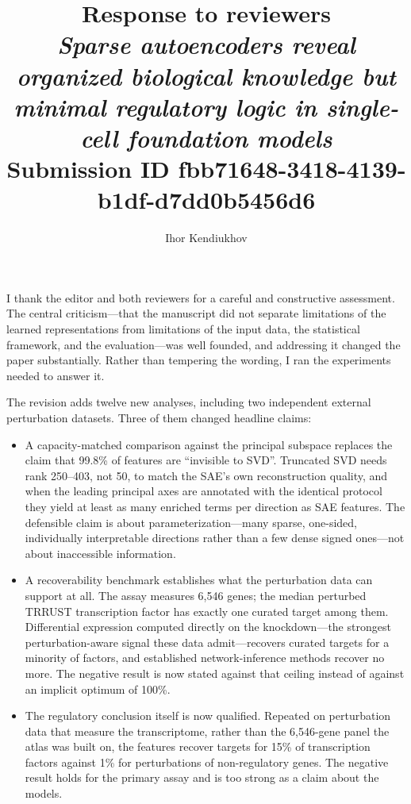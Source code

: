\documentclass[11pt]{article}
\title{Response to reviewers\\[4pt]
\large \emph{Sparse autoencoders reveal organized biological knowledge but minimal regulatory
logic in single-cell foundation models}\\[2pt]
\normalsize Submission ID fbb71648-3418-4139-b1df-d7dd0b5456d6}
\author{Ihor Kendiukhov}
\date{}
\begin{document}
\maketitle

\noindent
I thank the editor and both reviewers for a careful and constructive assessment. The central
criticism---that the manuscript did not separate limitations of the learned representations from
limitations of the input data, the statistical framework, and the evaluation---was well founded,
and addressing it changed the paper substantially. Rather than tempering the wording, I ran the
experiments needed to answer it.

The revision adds twelve new analyses, including two independent external perturbation datasets. Three of them changed headline claims:

\begin{itemize}[leftmargin=1.2em]
\item A capacity-matched comparison against the principal subspace replaces the claim that 99.8\%
of features are ``invisible to SVD''. Truncated SVD needs rank 250--403, not 50, to match the SAE's
own reconstruction quality, and when the leading principal axes are annotated with the identical
protocol they yield at least as many enriched terms per direction as SAE features. The defensible
claim is about parameterization---many sparse, one-sided, individually interpretable directions
rather than a few dense signed ones---not about inaccessible information.

\item A recoverability benchmark establishes what the perturbation data can support at all. The
assay measures 6,546 genes; the median perturbed TRRUST transcription factor has exactly one
curated target among them. Differential expression computed directly on the knockdown---the
strongest perturbation-aware signal these data admit---recovers curated targets for a minority of
factors, and established network-inference methods recover no more. The negative result is now
stated against that ceiling instead of against an implicit optimum of 100\%.


\noindent
\item The regulatory conclusion itself is now qualified. Repeated on perturbation data that measure
the transcriptome, rather than the 6,546-gene panel the atlas was built on, the features recover
targets for 15\% of transcription factors against 1\% for perturbations of non-regulatory genes.
The negative result holds for the primary assay and is too strong as a claim about the models.
\end{itemize}
\end{document}

